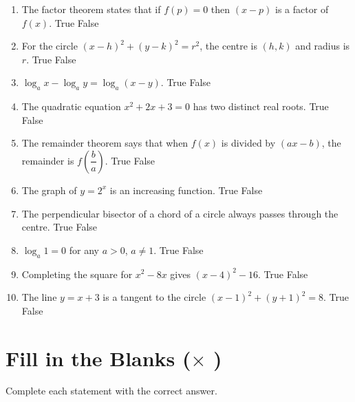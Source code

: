\documentclass{sbs-exam}
\begin{document}
\begin{enumerate}
    \item The factor theorem states that if $f(p)=0$ then $(x-p)$ is a factor of $f(x)$. \hfill True \quad False

    \item For the circle $(x-h)^2 + (y-k)^2 = r^2$, the centre is $(h,k)$ and radius is $r$. \hfill True \quad False

    \item $\log_a x - \log_a y = \log_a (x-y)$. \hfill True \quad False

    \item The quadratic equation $x^2 + 2x + 3 = 0$ has two distinct real roots. \hfill True \quad False

    \item The remainder theorem says that when $f(x)$ is divided by $(ax-b)$, the remainder is $f\!\left(\dfrac{b}{a}\right)$. \hfill True \quad False

    \item The graph of $y = 2^x$ is an increasing function. \hfill True \quad False

    \item The perpendicular bisector of a chord of a circle always passes through the centre. \hfill True \quad False

    \item $\log_a 1 = 0$ for any $a>0$, $a\neq 1$. \hfill True \quad False

    \item Completing the square for $x^2 - 8x$ gives $(x-4)^2 - 16$. \hfill True \quad False

    \item The line $y = x + 3$ is a tangent to the circle $(x-1)^2 + (y+1)^2 = 8$. \hfill True \quad False
\end{enumerate}

\makeatletter
\section*{Fill in the Blanks (\@SAQ $\times$ \@SAQNo)}
\makeatother
Complete each statement with the correct answer.
\end{document}
